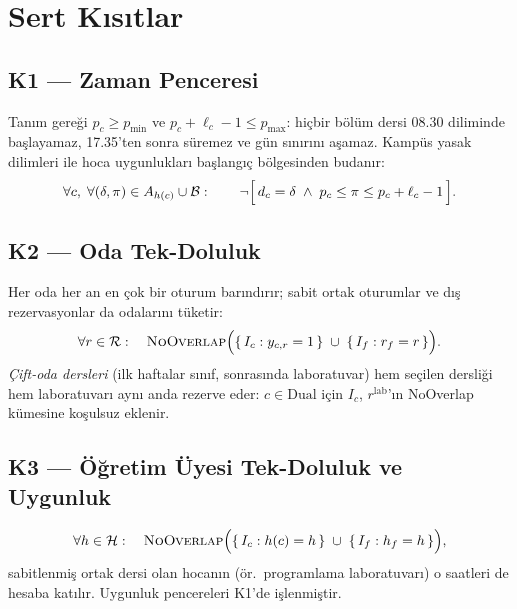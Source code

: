 \documentclass[11pt,a4paper]{article}
\theoremstyle{definition}
\newcommand{\SET}[1]{\mathcal{#1}}
\begin{document}
\section{Sert Kısıtlar}

\subsection*{K1 --- Zaman Penceresi}
Tanım gereği $p_c\ge p_{\min}$ ve $p_c+\ell_c-1\le p_{\max}$: hiçbir bölüm dersi
08.30 diliminde başlayamaz, 17.35'ten sonra süremez ve gün sınırını aşamaz.
Kampüs yasak dilimleri ile hoca uygunlukları başlangıç bölgesinden budanır:
\begin{equation}
\forall c,\;\forall(\delta,\pi)\in A_{h(c)}\cup\SET{B}:\qquad
\neg\Bigl[\,d_c=\delta \;\wedge\; p_c \le \pi \le p_c+\ell_c-1\,\Bigr].
\end{equation}

\subsection*{K2 --- Oda Tek-Doluluk}
Her oda her an en çok bir oturum barındırır; sabit ortak oturumlar ve dış
rezervasyonlar da odalarını tüketir:
\begin{equation}
\forall r\in\SET{R}:\quad
\textsc{NoOverlap}\Bigl(\{\,I_c : y_{c,r}=1\,\}\;\cup\;\{\,I_f : r_f=r\,\}\Bigr).
\end{equation}
\emph{Çift-oda dersleri} (ilk haftalar sınıf, sonrasında laboratuvar) hem seçilen
dersliği hem laboratuvarı aynı anda rezerve eder: $c\in\text{Dual}$ için $I_c$,
$r^{\mathrm{lab}}$'ın NoOverlap kümesine koşulsuz eklenir.

\subsection*{K3 --- Öğretim Üyesi Tek-Doluluk ve Uygunluk}
\begin{equation}
\forall h\in\SET{H}:\quad
\textsc{NoOverlap}\Bigl(\{\,I_c : h(c)=h\,\}\;\cup\;\{\,I_f : h_f=h\,\}\Bigr),
\end{equation}
sabitlenmiş ortak dersi olan hocanın (ör.\ programlama laboratuvarı) o saatleri
de hesaba katılır. Uygunluk pencereleri K1'de işlenmiştir.
\end{document}
